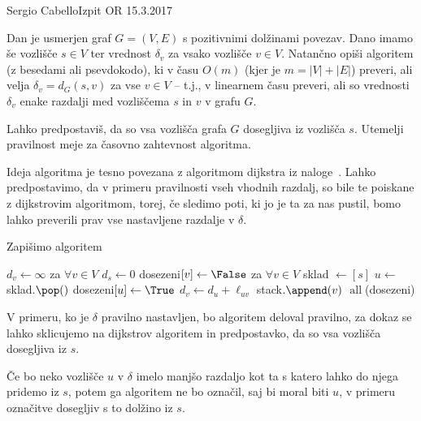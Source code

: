 \begin{naloga}{Sergio Cabello}{Izpit OR 15.3.2017}
\begin{vprasanje}
Dan je usmerjen graf $G = (V, E)$ s pozitivnimi dolžinami povezav.
Dano imamo še vozlišče $s \in V$
ter vrednost $\delta_v$ za vsako vozlišče $v \in V$.
Natančno opiši algoritem (z besedami ali psevdokodo),
ki v času $O(m)$ (kjer je $m = |V| + |E|$) preveri,
ali velja $\delta_v = d_G(s, v)$ za vse $v \in V$
-- t.j., v linearnem času preveri,
ali so vrednosti $\delta_v$
enake razdalji med vozliščema $s$ in $v$ v grafu $G$.

Lahko predpostaviš, da so vsa vozlišča grafa $G$ dosegljiva iz vozlišča $s$.
Utemelji pravilnost meje za časovno zahtevnost algoritma.
\end{vprasanje}
\begin{odgovor}

Ideja algoritma je tesno povezana z algoritmom {\sc dijkstra} iz naloge~\nal[dijkstra].
Lahko predpostavimo, da v primeru pravilnosti vseh vhodnih razdalj, so bile te poiskane z dijkstrovim algoritmom,
torej, če sledimo poti, ki jo je ta za nas pustil, bomo lahko preverili prav vse nastavljene razdalje v $\delta$.

Zapišimo algoritem

\begin{small}
\begin{algorithmic}
		\State \Return \False
	\EndIf
	\State $d_v \gets \infty$ za  $\forall v \in V$
	\State $d_s \gets 0$
	\State dosezeni$[v] \gets \False$ za $\forall v \in V$
	\State sklad $\gets [s]$
		\State $u \gets$ sklad.$\pop()$
		\State dosezeni$[u] \gets \True$
				\State $d_v \gets d_u + \ell_{uv}$
					\State stack$.\append(v)$
				\EndIf
				\State \Return \False
			\EndIf
		\EndFor
	\EndWhile
	\State \Return $\operatorname{all}$(dosezeni)
\EndFunction
\end{algorithmic}
\end{small}

V primeru, ko je $\delta$ pravilno nastavljen, bo algoritem deloval pravilno, 
za dokaz se lahko sklicujemo na dijkstrov algoritem in predpostavko, da so vsa vozlišča dosegljiva iz $s$.

Če bo neko vozlišče $u$ v $\delta$ imelo manjšo razdaljo kot ta s katero lahko do njega pridemo iz $s$,
potem ga algoritem ne bo označil, saj bi moral biti $u$, v primeru označitve dosegljiv s to dolžino iz $s$.


\end{odgovor}
\end{naloga}
